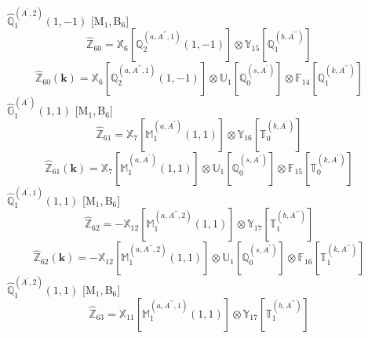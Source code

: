 \documentclass[fleqn,10pt,landscape]{article}
\begin{document}
\begin{itemize}
\begin{dmath*}
\end{dmath*}
\vspace{4mm}
\noindent {} $\,\,\,\hat{\mathbb{Q}}_{1}^{(A^{\prime},2)}(1,-1)$ [M$_{1}$,\,B$_{6}$]
\begin{dmath*}
\hat{\mathbb{Z}}_{60}=\mathbb{X}_{6}[\mathbb{Q}_{2}^{(a,A^{\prime\prime},1)}(1,-1)] \otimes\mathbb{Y}_{15}[\mathbb{Q}_{1}^{(b,A^{\prime\prime})}]
\end{dmath*}
\begin{dmath*}
\hat{\mathbb{Z}}_{60}(\bm{k})=\mathbb{X}_{6}[\mathbb{Q}_{2}^{(a,A^{\prime\prime},1)}(1,-1)] \otimes\mathbb{U}_{1}[\mathbb{Q}_{0}^{(s,A^{\prime})}] \otimes\mathbb{F}_{14}[\mathbb{Q}_{1}^{(k,A^{\prime\prime})}]
\end{dmath*}
\vspace{4mm}
\noindent {} $\,\,\,\hat{\mathbb{G}}_{1}^{(A^{\prime})}(1,1)$ [M$_{1}$,\,B$_{6}$]
\begin{dmath*}
\hat{\mathbb{Z}}_{61}=\mathbb{X}_{7}[\mathbb{M}_{1}^{(a,A^{\prime})}(1,1)] \otimes\mathbb{Y}_{16}[\mathbb{T}_{0}^{(b,A^{\prime})}]
\end{dmath*}
\begin{dmath*}
\hat{\mathbb{Z}}_{61}(\bm{k})=\mathbb{X}_{7}[\mathbb{M}_{1}^{(a,A^{\prime})}(1,1)] \otimes\mathbb{U}_{1}[\mathbb{Q}_{0}^{(s,A^{\prime})}] \otimes\mathbb{F}_{15}[\mathbb{T}_{0}^{(k,A^{\prime})}]
\end{dmath*}
\vspace{4mm}
\noindent {} $\,\,\,\hat{\mathbb{Q}}_{1}^{(A^{\prime},1)}(1,1)$ [M$_{1}$,\,B$_{6}$]
\begin{dmath*}
\hat{\mathbb{Z}}_{62}=- \mathbb{X}_{12}[\mathbb{M}_{1}^{(a,A^{\prime\prime},2)}(1,1)] \otimes\mathbb{Y}_{17}[\mathbb{T}_{1}^{(b,A^{\prime\prime})}]
\end{dmath*}
\begin{dmath*}
\hat{\mathbb{Z}}_{62}(\bm{k})=- \mathbb{X}_{12}[\mathbb{M}_{1}^{(a,A^{\prime\prime},2)}(1,1)] \otimes\mathbb{U}_{1}[\mathbb{Q}_{0}^{(s,A^{\prime})}] \otimes\mathbb{F}_{16}[\mathbb{T}_{1}^{(k,A^{\prime\prime})}]
\end{dmath*}
\vspace{4mm}
\noindent {} $\,\,\,\hat{\mathbb{Q}}_{1}^{(A^{\prime},2)}(1,1)$ [M$_{1}$,\,B$_{6}$]
\begin{dmath*}
\hat{\mathbb{Z}}_{63}=\mathbb{X}_{11}[\mathbb{M}_{1}^{(a,A^{\prime\prime},1)}(1,1)] \otimes\mathbb{Y}_{17}[\mathbb{T}_{1}^{(b,A^{\prime\prime})}]
\end{dmath*}
\begin{dmath*}

\end{dmath*}
\end{itemize}
\end{document}

